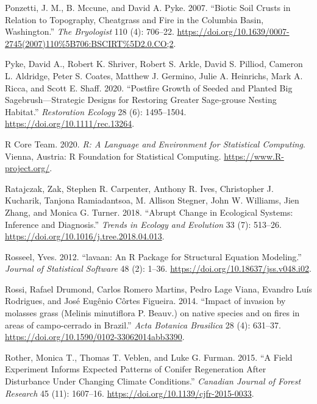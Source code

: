 \documentclass[
  12pt,
]{article}
\newlength{\cslhangindent}
\newlength{\cslentryspacingunit} %
\newenvironment{CSLReferences}[2] %
 {%
  \setlength{\parindent}{0pt}
  \ifodd #1
  \let\oldpar\par
  \def\par{\hangindent=\cslhangindent\oldpar}
  \fi
  \setlength{\parskip}{#2\cslentryspacingunit}
 }%
 {}
\begin{document}
\begin{CSLReferences}{1}{0}
\leavevmode{}%
Ponzetti, J. M., B. Mccune, and David A. Pyke. 2007. {``Biotic Soil
Crusts in Relation to Topography, Cheatgrass and Fire in the {Columbia}
{Basin}, {Washington}.''} \emph{The Bryologist} 110 (4): 706--22.
\url{https://doi.org/10.1639/0007-2745(2007)110\%5B706:BSCIRT\%5D2.0.CO;2}.

\leavevmode{}%
Pyke, David A., Robert K. Shriver, Robert S. Arkle, David S. Pilliod,
Cameron L. Aldridge, Peter S. Coates, Matthew J. Germino, Julie A.
Heinrichs, Mark A. Ricca, and Scott E. Shaff. 2020. {``Postfire Growth
of Seeded and Planted Big Sagebrush---Strategic Designs for Restoring
Greater Sage‐grouse Nesting Habitat.''} \emph{Restoration Ecology} 28
(6): 1495--1504. \url{https://doi.org/10.1111/rec.13264}.

\leavevmode{}%
R Core Team. 2020. \emph{R: A Language and Environment for Statistical
Computing}. Vienna, Austria: R Foundation for Statistical Computing.
\url{https://www.R-project.org/}.

\leavevmode{}%
Ratajczak, Zak, Stephen R. Carpenter, Anthony R. Ives, Christopher J.
Kucharik, Tanjona Ramiadantsoa, M. Allison Stegner, John W. Williams,
Jien Zhang, and Monica G. Turner. 2018. {``{Abrupt Change in Ecological
Systems: Inference and Diagnosis}.''} \emph{Trends in Ecology and
Evolution} 33 (7): 513--26.
\url{https://doi.org/10.1016/j.tree.2018.04.013}.

\leavevmode{}%
Rosseel, Yves. 2012. {``{lavaan}: An {R} Package for Structural Equation
Modeling.''} \emph{Journal of Statistical Software} 48 (2): 1--36.
\url{https://doi.org/10.18637/jss.v048.i02}.

\leavevmode{}%
Rossi, Rafael Drumond, Carlos Romero Martins, Pedro Lage Viana, Evandro
Luís Rodrigues, and José Eugênio Côrtes Figueira. 2014. {``{Impact of
invasion by molasses grass (Melinis minutiflora P. Beauv.) on native
species and on fires in areas of campo-cerrado in Brazil}.''} \emph{Acta
Botanica Brasilica} 28 (4): 631--37.
\url{https://doi.org/10.1590/0102-33062014abb3390}.

\leavevmode{}%
Rother, Monica T., Thomas T. Veblen, and Luke G. Furman. 2015. {``A
Field Experiment Informs Expected Patterns of Conifer Regeneration After
Disturbance Under Changing Climate Conditions.''} \emph{Canadian Journal
of Forest Research} 45 (11): 1607--16.
\url{https://doi.org/10.1139/cjfr-2015-0033}.


\end{CSLReferences}
\end{document}

